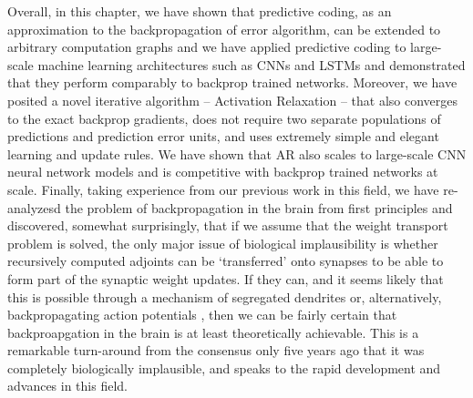 Overall, in this chapter, we have shown that predictive coding, as an approximation to the backpropagation of error algorithm, can be extended to arbitrary computation graphs and we have applied predictive coding to large-scale machine learning architectures such as CNNs and LSTMs and demonstrated that they perform comparably to backprop trained networks. Moreover, we have posited a novel iterative algorithm -- Activation Relaxation -- that also converges to the exact backprop gradients, does not require two separate populations of predictions and prediction error units, and uses extremely simple and elegant learning and update rules. We have shown that AR also scales to large-scale CNN neural network models and is competitive with backprop trained networks at scale. Finally, taking experience from our previous work in this field, we have re-analyzesd the problem of backpropagation in the brain from first principles and discovered, somewhat surprisingly, that if we assume that the weight transport problem is solved, the only major issue of biological implausibility is whether recursively computed adjoints can be `transferred' onto synapses to be able to form part of the synaptic weight updates. If they can, and it seems likely that this is possible through a mechanism of segregated dendrites or, alternatively, backpropagating action potentials \citep{stuart1997action}, then we can be fairly certain that backproapgation in the brain is at least theoretically achievable. This is a remarkable turn-around from the consensus only five years ago that it was completely biologically implausible, and speaks to the rapid development and advances in this field.

